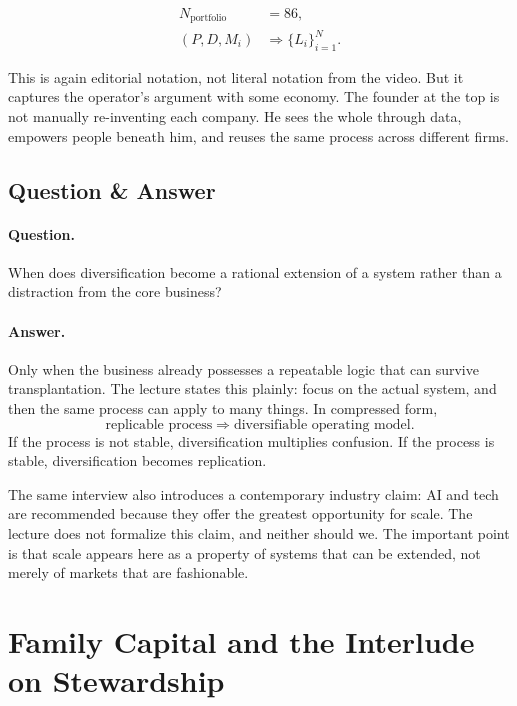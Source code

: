 \begin{align}
N_{\text{portfolio}} &= 86,\\
(P,D,M_i) &\Rightarrow \{L_i\}_{i=1}^{N}.
\end{align}

This is again editorial notation, not literal notation from the video. But it captures the operator's argument with some economy. The founder at the top is not manually re-inventing each company. He sees the whole through data, empowers people beneath him, and reuses the same process across different firms.

\subsection{Question \& Answer}

\paragraph{Question.} When does diversification become a rational extension of a system rather than a distraction from the core business?

\paragraph{Answer.} Only when the business already possesses a repeatable logic that can survive transplantation. The lecture states this plainly: focus on the actual system, and then the same process can apply to many things. In compressed form,
\begin{equation}
\text{replicable process} \Rightarrow \text{diversifiable operating model}.
\end{equation}
If the process is not stable, diversification multiplies confusion. If the process is stable, diversification becomes replication.

The same interview also introduces a contemporary industry claim: AI and tech are recommended because they offer the greatest opportunity for scale. The lecture does not formalize this claim, and neither should we. The important point is that scale appears here as a property of systems that can be extended, not merely of markets that are fashionable.

\section{Family Capital and the Interlude on Stewardship}

